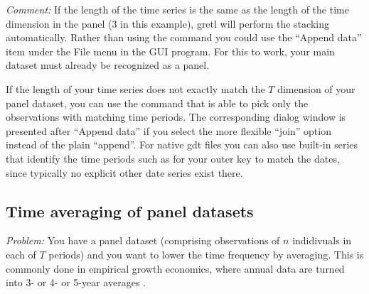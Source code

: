 \emph{Comment:} If the length of the time series is the same as the
length of the time dimension in the panel (3 in this example), gretl
will perform the stacking automatically.  Rather than using the
 command you could use the ``Append data'' item under
the \textsf{File} menu in the GUI program.  For this to work, your
main dataset must already be recognized as a panel.  

If the length of your time series does not exactly match the $T$ 
dimension of your panel dataset, you can use the  command 
that is able to pick only the observations with matching time periods. 
The corresponding
dialog window is presented after ``Append data'' if you select the
more flexible ``join'' option instead of the plain ``append''. 
For native gdt files you can also use built-in series that identify
the time periods such as  for your outer key to match
the dates, since typically no explicit other date series exist there. 


\subsection{Time averaging of panel datasets}

\emph{Problem:} You have a panel dataset (comprising observations of
$n$ indidivuals in each of $T$ periods) and you want to lower the time
frequency by averaging. This is commonly done in empirical growth
economics, where annual data are turned into 3- or 4- or 5-year
averages \citep[see for example][]{Islam1995}.

